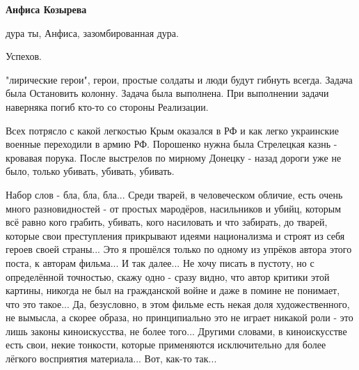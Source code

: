 \begin{itemize}
\begin{itemize}
 
\textbf{Анфиса Козырева} 

дура ты, Анфиса, зазомбированная дура.

Успехов.

\end{itemize}

 

"лирические герои", герои, простые солдаты и люди будут гибнуть всегда. Задача
была Остановить колонну. Задача была выполнена. При выполнении задачи наверняка
погиб кто-то со стороны Реализации.


 

Всех потрясло с какой легкостью Крым оказался в РФ и как легко украинские
военные переходили в армию РФ. Порошенко нужна была Стрелецкая казнь - кровавая
порука. После выстрелов по мирному Донецку - назад дороги уже не было, только
убивать, убивать, убивать.

 

Набор слов - бла, бла, бла... Среди тварей, в человеческом обличие, есть очень
много разновидностей - от простых мародёров, насильников и убийц, которым всё
равно кого грабить, убивать, кого насиловать и что забирать, до тварей, которые
свои преступления прикрывают идеями национализма и строят из себя героев своей
страны... Это я прошёлся только по одному из упрёков автора этого поста, к
авторам фильма... И так далее... Не хочу писать в пустоту, но с определённой
точностью, скажу одно - сразу видно, что автор критики этой картины, никогда не
был на гражданской войне и даже в помине не понимает, что это такое... Да,
безусловно, в этом фильме есть некая доля художественного, не вымысла, а скорее
образа, но принципиально это не играет никакой роли - это лишь законы
киноискусства, не более того... Другими словами, в киноискусстве есть свои,
некие тонкости, которые применяются исключительно для более лёгкого восприятия
материала... Вот, как-то так...


\end{itemize}
